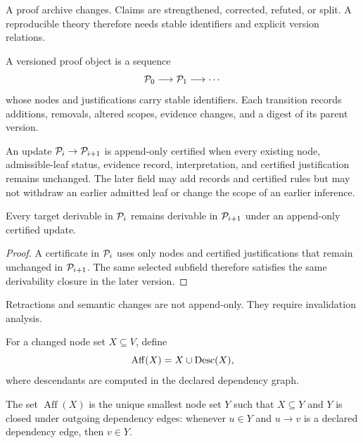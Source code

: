 A proof archive changes. Claims are strengthened, corrected, refuted, or split. A reproducible theory therefore needs stable identifiers and explicit version relations.

\begin{PPTdefinition}
\label{PPT:res:15:1}
A versioned proof object is a sequence
\[
\mathcal P_0\longrightarrow\mathcal P_1\longrightarrow\cdots
\]
whose nodes and justifications carry stable identifiers. Each transition records additions, removals, altered scopes, evidence changes, and a digest of its parent version.
\end{PPTdefinition}

\begin{PPTdefinition}
\label{PPT:res:15:2}
An update $\mathcal P_i\to\mathcal P_{i+1}$ is append-only certified when every existing node, admissible-leaf status, evidence record, interpretation, and certified justification remains unchanged. The later field may add records and certified rules but may not withdraw an earlier admitted leaf or change the scope of an earlier inference.
\end{PPTdefinition}

\begin{PPTtheorem}
\label{PPT:res:15:3}
Every target derivable in $\mathcal P_i$ remains derivable in $\mathcal P_{i+1}$ under an append-only certified update.
\end{PPTtheorem}

\begin{proof}
A certificate in $\mathcal P_i$ uses only nodes and certified justifications that remain unchanged in $\mathcal P_{i+1}$. The same selected subfield therefore satisfies the same derivability closure in the later version.
\end{proof}

Retractions and semantic changes are not append-only. They require invalidation analysis.

\begin{PPTdefinition}
\label{PPT:res:15:4}
For a changed node set $X\subseteq V$, define
\[
\operatorname{Aff}(X)=X\cup\operatorname{Desc}(X),
\]
where descendants are computed in the declared dependency graph.
\end{PPTdefinition}

\begin{PPTtheorem}
\label{PPT:res:15:5}
The set $\operatorname{Aff}(X)$ is the unique smallest node set $Y$ such that $X\subseteq Y$ and $Y$ is closed under outgoing dependency edges: whenever $u\in Y$ and $u\to v$ is a declared dependency edge, then $v\in Y$.
\end{PPTtheorem}

